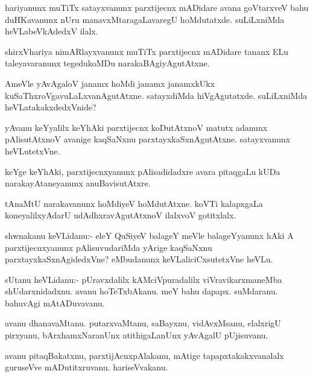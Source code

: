 \begin{mng}
hariyanunx muTiTx satayxvanunx parxtijecnx mADidare avana goVtarxveV bahu duHKavanunx nUru manavxMtaragaLavaregU hoMdutatxde. suLiLxniMda heVLabeVkAdedxV ilalx.
\end{mng}

\begin{mng}
shirxVhariya nimARlayxvanunx muTiTx parxtijecnx mADidare tananx ELu taleyavaranunx tegedukoMDu narakaBAgiyAgutAtxne.
\end{mng}

\begin{mng}
AmeVle yAvAgaloV janamx hoMdi janamx janamxkUkx kuSaThxroVgavuLaLxvanAgutAtxne. satayxdiMda hiVgAgutatxde. suLiLxniMda heVLatakakxdedxVnide?
\end{mng}

\begin{mng}
yAvanu keYyalilx keYhAki parxtijecnx koDutAtxnoV matutx adanunx pAlisutAtxnoV avanige kaqSaNxnu parxtayxkaSxnAgutAtxne. satayxvanunx heVLutetxVne.
\end{mng}

\begin{mng}
keYge keYhAki, parxtijecnxyanunx pAlisadidadxre avara pitaqgaLu kUDa narakayAtaneyanunx anuBavisutAtxre.
\end{mng}

\begin{mng}
tAnaMtU narakavanunx hoMdiyeV hoMdutAtxne. koVTi kalapxgaLa koneyalilxyAdarU udAdhxravAgutAtxnoV ilalxvoV gotitxlalx.
\end{mng}

\begin{mng}
shwnakanu keVLidanu:- eleY QuSiyeV balageY meVle balageYyanunx hAki A parxtijecnxyanunx pAlisuvudariMda yArige kaqSaNxnu parxtayxkaSxnAgidedxVne? eMbudanunx keVLaliciCxsutetxVne heVLu.
\end{mng}

\begin{mng}
sUtanu heVLidanu:- pUravxdalilx kAMciVpuradalilx viVravikarxmaneMba shUdarxnidadxnu. avanu hoTeTxbAkanu. meY bahu dapapx. suMdaranu. bahuvAgi mAtADuvavanu.
\end{mng}

\begin{mng}
avanu dhanavaMtanu. putarxvaMtanu, saBayxnu, vidAvxMsanu, elalxrigU pirxyanu, bArxhamxNaranUnx atithigaLanUnx yAvAgalU pUjisuvanu.
\end{mng}

\begin{mng}
avanu pitaqBakatxnu, parxtijAcnxpAlakanu, mAtige tapapxtakakxvanalalx guruseVve mADutitxruvanu. hariseVvakanu.
\end{mng}

